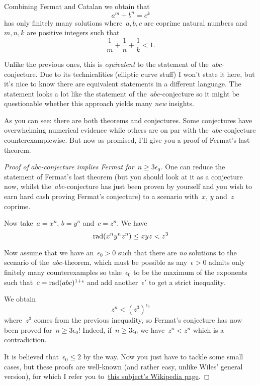 \begin{description}
    Combining Fermat and Catalan we obtain that
    \begin{equation}
      a^m+b^n=c^k
    \end{equation}
    has only finitely many solutions where~$a,b,c$ are coprime natural numbers and~$m,n,k$ are positive integers such that
    \begin{equation}
      \frac{1}{m}+\frac{1}{n}+\frac{1}{k}<1.
    \end{equation}

  \item[\textbf{Szpiro's conjecture}] Unlike the previous ones, this is \emph{equivalent} to the statement of the~$abc$-conjecture. Due to its technicalities (elliptic curve stuff) I won't state it here, but it's nice to know there are equivalent statements in a different language. The statement looks a lot like the statement of the~$abc$\nobreakdash-conjecture so it might be questionable whether this approach yields many \emph{new} insights.
\end{description}

As you can see: there are both theorems and conjectures. Some conjectures have overwhelming numerical evidence while others are on par with the~$abc$-conjecture counterexamplewise. But now as promised, I'll give you a proof of Fermat's last theorem.


\begin{proof}[Proof of $abc$-conjecture implies Fermat for~$n\geq3\epsilon_0$]
  One can reduce the statement of Fermat's last theorem (but you should look at it as a conjecture now, whilst the~$abc$\nobreakdash-conjecture has just been proven by yourself and you wish to earn hard cash proving Fermat's conjecture) to a scenario with~$x$, $y$ and~$z$ coprime.
  
  Now take~$a=x^n$, $b=y^n$ and~$c=z^n$. We have
  \begin{equation}
    \operatorname{rad}(x^ny^nz^n)\leq xyz<z^3
  \end{equation}

  Now assume that we have an~$\epsilon_0>0$ such that there are \emph{no} solutions to the scenario of the~$abc$\nobreakdash-theorem, which must be possible as any~$\epsilon>0$ admits only finitely many counterexamples so take~$\epsilon_0$ to be the maximum of the exponents such that~$c=\operatorname{rad}(abc)^{1+\epsilon}$ and add another~$\epsilon'$ to get a strict inequality.
  
  We obtain
  \begin{equation}
    z^n<(z^3)^{\epsilon_0}
  \end{equation}
  where~$z^3$ comes from the previous inequality, so Fermat's conjecture has now been proved for~$n\geq 3\epsilon_0$! Indeed, if~$n\geq 3\epsilon_0$ we have~$z^n<z^n$ which is a contradiction.

  It is believed that~$\epsilon_0\leq 2$ by the way. Now you just have to tackle some small cases, but these proofs are well-known (and rather easy, unlike Wiles' general version), for which I refer you to~\href{http://en.wikipedia.org/wiki/Fermat's_Last_Theorem#Proofs_for_specific_exponents}{this subject's Wikipedia page}.
\end{proof}
